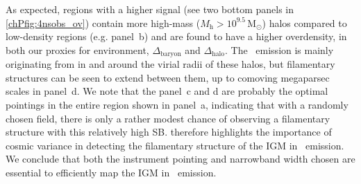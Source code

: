 As expected, regions with a higher signal (see two bottom panels in \cref{chPfig:4nsobs_ov}) contain more high-mass ($M_\mathrm{h} > 10^{9.5} \, \mathrm{M_\odot}$) halos compared to low-density regions (e.g. panel~b) and are found to have a higher overdensity, in both our proxies for environment, $\Delta_\mathrm{baryon}$ and $\Delta_\mathrm{halo}$. The \lya\ emission is mainly originating from in and around the virial radii of these halos, but filamentary structures can be seen to extend between them, up to comoving megaparsec scales in panel~d. We note that the panel~c and d are probably the optimal pointings in the entire region shown in panel~a, indicating that with a randomly chosen field, there is only a rather modest chance of observing a filamentary structure with this relatively high SB.  therefore highlights the importance of cosmic variance in detecting the filamentary structure of the IGM in \lya\ emission. We conclude that both the instrument pointing and narrowband width chosen are essential to efficiently map the IGM in \lya\ emission.
